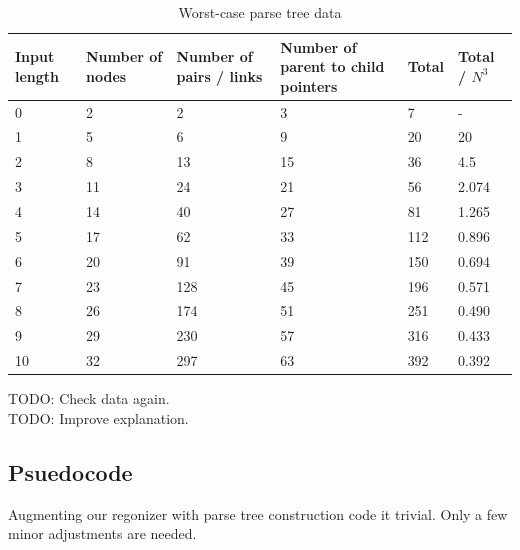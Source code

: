 \documentclass[a4paper,10pt]{article}
\begin{document}
\begin{table}[H]
\centering
\begin{tabular}{ | p{4em} | p{4em} | p{4em} | p{5em} | p{4em} | p{4em} | }
  \hline
  Input length & Number of nodes & Number of pairs / links & Number of parent to child pointers & Total & Total / $N^{3}$ \\
  \hline
  0 & 2 & 2 & 3 & 7 & - \\
  1 & 5 & 6 & 9 & 20 & 20 \\
  2 & 8 & 13 & 15 & 36 & 4.5 \\
  3 & 11 & 24 & 21 & 56 & 2.074 \\
  4 & 14 & 40 & 27 & 81 & 1.265 \\
  5 & 17 & 62 & 33 & 112 & 0.896 \\
  6 & 20 & 91 & 39 & 150 & 0.694 \\
  7 & 23 & 128 & 45 & 196 & 0.571 \\
  8 & 26 & 174 & 51 & 251 & 0.490 \\
  9 & 29 & 230 & 57 & 316 & 0.433 \\
  10 & 32 & 297 & 63 & 392 & 0.392 \\
  \hline
\end{tabular}
\caption{Worst-case parse tree data}
\end{table}

TODO: Check data again.\\
TODO: Improve explanation.

\subsection{Psuedocode}

Augmenting our regonizer with parse tree construction code it trivial. Only a few minor adjustments are needed.
\end{document}

